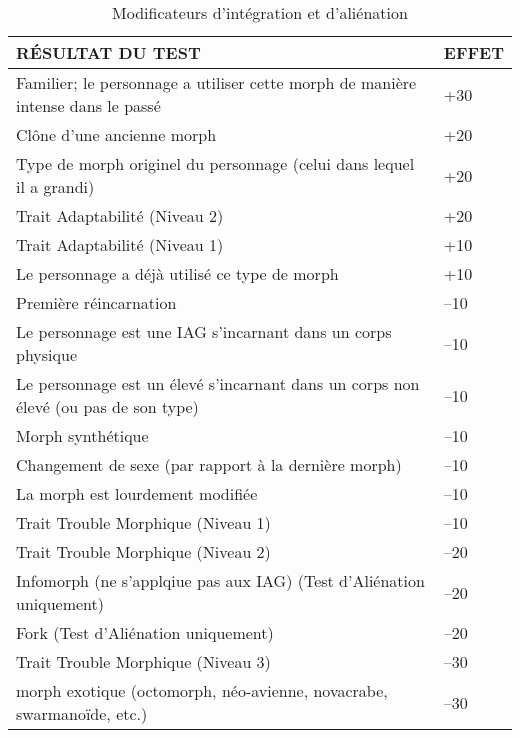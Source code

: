 \begin{table} \caption{Modificateurs d'intégration et d'aliénation} \begin{tabular}{|l|l|} 



\hline

RÉSULTAT DU TEST &EFFET\\ \hline

Familier; le personnage a utiliser cette morph de manière intense dans le passé &+30 \\ \hline

Clône d'une ancienne morph &+20 \\ \hline

Type de morph originel du personnage (celui dans lequel il a grandi) &+20 \\ \hline

Trait Adaptabilité (Niveau 2) &+20 \\ \hline

Trait Adaptabilité (Niveau 1) &+10 \\ \hline

Le personnage a déjà utilisé ce type de morph &+10 \\ \hline

Première réincarnation &–10 \\ \hline

Le personnage est une IAG s'incarnant dans un corps physique &–10 \\ \hline

Le personnage est un élevé s'incarnant dans un corps non élevé (ou pas de son type) &–10 \\ \hline

Morph synthétique &–10 \\ \hline

Changement de sexe (par rapport à la dernière morph) &–10 \\ \hline

La morph est lourdement modifiée &–10 \\ \hline

Trait Trouble Morphique (Niveau 1) &–10 \\ \hline

Trait Trouble Morphique (Niveau 2) &–20 \\ \hline

Infomorph (ne s'applqiue pas aux IAG) (Test d'Aliénation uniquement) &–20 \\ \hline

Fork (Test d'Aliénation uniquement) &–20 \\ \hline

Trait Trouble Morphique (Niveau 3) &–30 \\ \hline

morph exotique (octomorph, néo-avienne, novacrabe, swarmanoïde, etc.) &–30 \\ \hline

\end{tabular} \end{table} 

